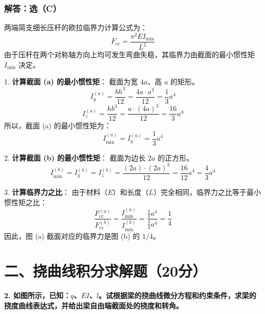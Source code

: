\documentclass[11pt,a4paper]{ctexrep}
\begin{document}
{\begin{minipage}{0.5\textwidth}
\end{minipage}

\subsubsection*{解答：选（C）}
两端简支细长压杆的欧拉临界力计算公式为：
\[
    F_{\text{cr}} = \frac{\pi^2 E I_{\min}}{L^2}
\]
由于压杆在两个对称轴方向上均可发生弯曲失稳，其临界力由截面的最小惯性矩 $I_{\min}$ 决定。

1. \textbf{计算截面 (a) 的最小惯性矩}：
   截面为宽 $4a$、高 $a$ 的矩形。
   \[
       I_y^{(a)} = \frac{b h^3}{12} = \frac{4a \cdot a^3}{12} = \frac{1}{3} a^4
   \]
   \[
       I_z^{(a)} = \frac{h b^3}{12} = \frac{a \cdot (4a)^3}{12} = \frac{16}{3} a^4
   \]
   所以，截面 (a) 的最小惯性矩为：
   \[
       I_{\min}^{(a)} = I_y^{(a)} = \frac{1}{3} a^4
   \]

2. \textbf{计算截面 (b) 的最小惯性矩}：
   截面为边长 $2a$ 的正方形。
   \[
       I_{\min}^{(b)} = I_y^{(b)} = I_z^{(b)} = \frac{(2a) \cdot (2a)^3}{12} = \frac{16}{12} a^4 = \frac{4}{3} a^4
   \]

3. \textbf{计算临界力之比}：
   由于材料（$E$）和长度（$L$）完全相同，临界力之比等于最小惯性矩之比：
   \[
       \frac{F_{\text{cr}}^{(a)}}{F_{\text{cr}}^{(b)}} = \frac{I_{\min}^{(a)}}{I_{\min}^{(b)}} = \frac{\frac{1}{3} a^4}{\frac{4}{3} a^4} = \frac{1}{4}
   \]
因此，图 (a) 截面对应的临界力是图 (b) 的 $1/4$。




\section*{二、挠曲线积分求解题（20分）}

\textbf{2. 如图所示，已知：$q$、$EI$、$l$。试根据梁的挠曲线微分方程和约束条件，求梁的挠度曲线表达式，并给出梁自由端截面处的挠度和转角。}

}
\end{document}
